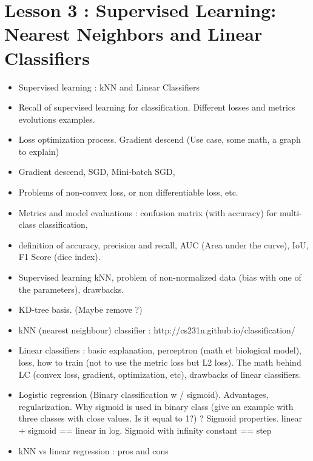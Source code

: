 \documentclass[12pt,a4paper]{article}
\begin{document}
\section{Lesson 3 : Supervised Learning: Nearest Neighbors and Linear Classifiers}
\begin{itemize}
    \item Supervised learning : kNN and Linear Classifiers
    \item Recall of supervised learning for classification. Different losses and metrics evolutions examples.
    \item Loss optimization process. Gradient descend (Use case, some math, a graph to explain)
    \item Gradient descend, SGD, Mini-batch SGD, 
    \item Problems of non-convex loss, or non differentiable loss, etc.
    \item Metrics and model evaluations : confusion matrix (with accuracy) for multi-class classification,
    \item definition of accuracy, precision and recall, AUC (Area under the curve), IoU, F1 Score (dice index).
    \item Supervised learning kNN, problem of non-normalized data (bias with one of the parameters), drawbacks.
    \item KD-tree basis. (Maybe remove ?)
    \item kNN (nearest neighbour) classifier : http://cs231n.github.io/classification/
    \item Linear classifiers : basic explanation, perceptron (math et biological model), loss, how to train (not to use the metric loss but L2 loss). The math behind LC (convex loss, gradient, optimization, etc), drawbacks of linear classifiers.
    \item Logistic regression (Binary classification w / sigmoid). Advantages, regularization.
    Why sigmoid is used in binary class (give an example with three classes with
    close values. Is it equal to 1?) ? Sigmoid properties. linear + sigmoid == linear in log.
    Sigmoid with infinity constant == step
    \item kNN vs linear regression : pros and cons
\end{itemize}
\end{document}
